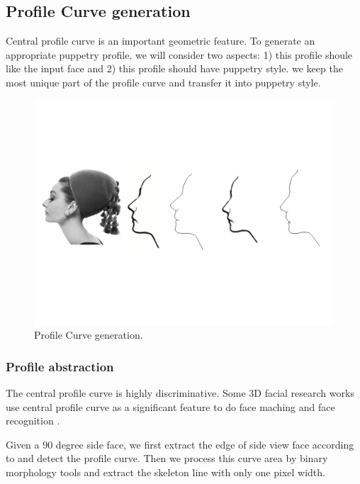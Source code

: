 \documentclass[letter]{sig-alternate}
\begin{document}
\subsection{Profile Curve generation}
Central profile curve is an important geometric feature. To generate an appropriate puppetry profile, we will consider two aspects: 1) this profile shoule like the input face and 2) this profile should have puppetry style. we keep the most unique part of the profile curve and transfer it into puppetry style.


\begin{figure}[t]
\begin{center}
\includegraphics[scale=0.3]{figure/profile_abstract.pdf}
\caption{\small{Profile Curve generation.}}
\label{fig:firstfig}
\end{center}
\end{figure}
    



\subsubsection{Profile abstraction}

The central profile curve is highly discriminative. Some 3D facial research works use central profile curve as a significant feature to do face maching \cite{pan20033d} and face recognition \cite{nagamine19923d}.

Given a 90 degree side face, we first extract the edge of side view face according to \cite{winnemoller2011xdog} and detect the profile curve. Then we process this curve area by binary morphology tools and extract the skeleton line with only one pixel width. 
\end{document}

